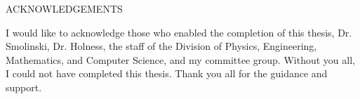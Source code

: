 \begin{center}

\begin{bfseries}

ACKNOWLEDGEMENTS\\

\end{bfseries}

\end{center}


\begin{flushleft}
\doublespacing
I would like to acknowledge those who enabled the completion of this thesis,
Dr. Smolinski, Dr. Holness, the staff of the Division of Physics, Engineering, Mathematics, and Computer Science,
and my committee group. Without you all, I could not have completed this thesis.
Thank you all for the guidance and support.\\
\singlespacing
\end{flushleft}


\pagebreak
